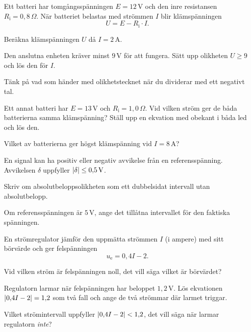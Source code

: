 Ett batteri har tomgångsspänningen $E = 12\,\text{V}$ och den inre resistansen
$R_{\text{i}} = 0{,}8\,\Omega$. När batteriet belastas med strömmen $I$ blir klämspänningen
\[
  U = E - R_{\text{i}} \cdot I.
\]


\begin{parts}
  \item Beräkna klämspänningen $U$ då $I = 2\,\text{A}$.
  \item Den anslutna enheten kräver minst $9\,\text{V}$ för att fungera. Sätt upp olikheten
    $U \geq 9$ och lös den för $I$.
    \begin{aside}
    \note[Tips] Tänk på vad som händer med olikhetstecknet när du dividerar med ett negativt tal.
    \end{aside}
  \item Ett annat batteri har $E = 13\,\text{V}$ och $R_{\text{i}} = 1{,}0\,\Omega$. Vid vilken ström
    ger de båda batterierna samma klämspänning? Ställ upp en ekvation med obekant i båda led och
    lös den.
  \item Vilket av batterierna ger högst klämspänning vid $I = 8\,\text{A}$?
\end{parts}

En signal kan ha positiv eller negativ avvikelse från en referensspänning. Avvikelsen $\delta$
uppfyller $\lvert\delta\rvert \leq 0{,}5\,\text{V}$.
\begin{parts}
  \item Skriv om absolut\-belopps\-olikheten som ett dubbelsidat intervall utan absolutbelopp.
  \item Om referensspänningen är $5\,\text{V}$, ange det tillåtna intervallet för den faktiska
    spänningen.
\end{parts}

En strömregulator jämför den uppmätta strömmen $I$ (i ampere) med sitt börvärde och ger
felspänningen
\[
  u_{\text{e}} = 0{,}4I - 2.
\]
\begin{parts}
  \item Vid vilken ström är felspänningen noll, det vill säga vilket är börvärdet?
  \item Regulatorn larmar när felspänningen har beloppet $1{,}2\,\text{V}$. Lös ekvationen
    $\lvert0{,}4I - 2\rvert = 1{,}2$ som två fall och ange de två strömmar där larmet triggar.
  \item Vilket strömintervall uppfyller $\lvert0{,}4I - 2\rvert < 1{,}2$, det vill säga när larmar
    regulatorn \emph{inte}?
\end{parts}

